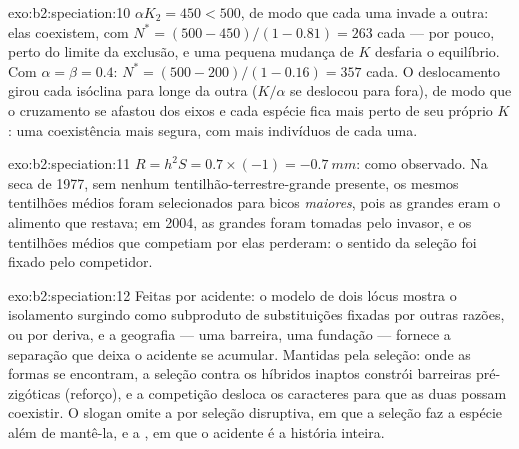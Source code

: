 \begin{solution}{exo:b2:speciation:10}
$\alpha K_2 = 450 < 500$, de modo que cada uma invade a outra: elas
coexistem, com $N^{*} = (500 - 450)/(1 - 0.81) = 263$ cada --- por pouco, perto do
limite da exclusão, e uma pequena mudança de $K$ desfaria o equilíbrio. Com
$\alpha = \beta = 0.4$: $N^{*} = (500 - 200)/(1 - 0.16) = 357$ cada.
O deslocamento girou cada isóclina para longe da outra ($K/\alpha$
se deslocou para fora), de modo que o cruzamento se afastou dos eixos e
cada espécie fica mais perto de seu próprio $K$: uma coexistência mais
segura, com mais indivíduos de cada uma.
\end{solution}

\begin{solution}{exo:b2:speciation:11}
$R = h^{2}S = 0.7\times(-1) = \qty{-0.7}{mm}$: como observado. Na
seca de 1977, sem nenhum tentilhão-terrestre-grande presente, os mesmos
tentilhões médios foram selecionados para bicos \emph{maiores}, pois as
 grandes eram o alimento que restava; em 2004, as 
grandes foram tomadas pelo invasor, e os tentilhões médios que competiam
por elas perderam: o sentido da seleção foi fixado pelo competidor.
\end{solution}

\begin{solution}{exo:b2:speciation:12}
Feitas por acidente: o modelo de dois lócus mostra o isolamento surgindo
como subproduto de substituições fixadas por outras razões, ou por
deriva, e a geografia --- uma barreira, uma fundação --- fornece a
separação que deixa o acidente se acumular. Mantidas pela seleção: onde
as formas se encontram, a seleção contra os híbridos inaptos constrói
barreiras pré-zigóticas (reforço), e a competição desloca os caracteres
para que as duas possam coexistir. O slogan omite a 
por seleção disruptiva, em que a seleção faz a espécie além de mantê-la,
e a , em que o acidente é a história inteira.
\end{solution}

